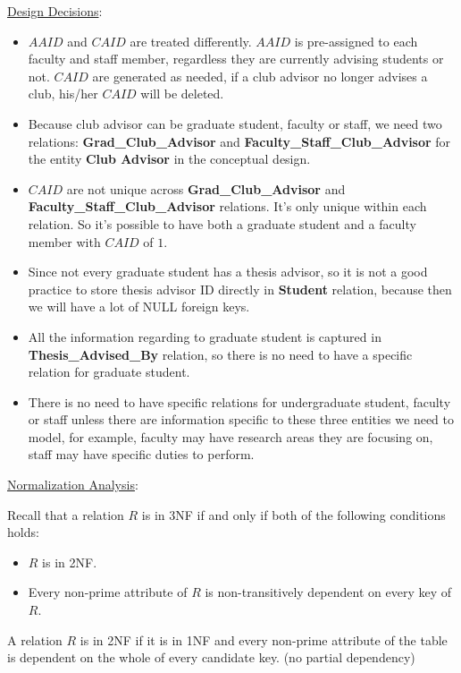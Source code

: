 \documentclass[10pt]{article}
\begin{document}
\underline{Design Decisions}:

\vspace{1em}
\begin{itemize}
\item $AAID$ and $CAID$ are treated differently. $AAID$ is
  pre-assigned to each faculty and staff member, 
  regardless they are currently advising students or not. $CAID$ are
  generated as needed, if a club advisor no longer advises a club,
  his/her $CAID$ will be deleted.
\item Because club advisor can be graduate student, faculty or staff,
  we need two relations: \textbf{Grad\_Club\_Advisor} and
  \textbf{Faculty\_Staff\_Club\_Advisor} for the entity \textbf{Club
    Advisor} in the conceptual design.
\item $CAID$ are not unique across \textbf{Grad\_Club\_Advisor} and
  \textbf{Faculty\_Staff\_Club\_Advisor} relations. It's only unique
  within each relation. So it's possible to have both a graduate
  student and a faculty member with $CAID$ of $1$.
\item Since not every graduate student has a thesis advisor, so it is
  not a good practice to store thesis advisor ID directly in
  \textbf{Student} relation, because then we will have a lot of NULL
  foreign keys.
\item All the information regarding to graduate student is captured in
  \textbf{Thesis\_Advised\_By} relation, so there is no need to have a
  specific relation for graduate student.
\item There is no need to have specific relations for undergraduate
  student, faculty or staff unless there are information specific to
  these three entities we need to model, for example, faculty may have
  research areas they are focusing on, staff may have specific duties
  to perform.
\end{itemize}


\underline{Normalization Analysis}:

\vspace{1em}
Recall that a relation $R$ is in 3NF if and only if both of the
following conditions holds:
\begin{itemize}
\item $R$ is in 2NF.
\item Every non-prime attribute of $R$ is non-transitively dependent
  on every key of $R$.
\end{itemize}

A relation $R$ is in 2NF if it is in 1NF and every non-prime attribute
of the table is dependent on the whole of every candidate key. (no
partial dependency)\\
\end{document}
